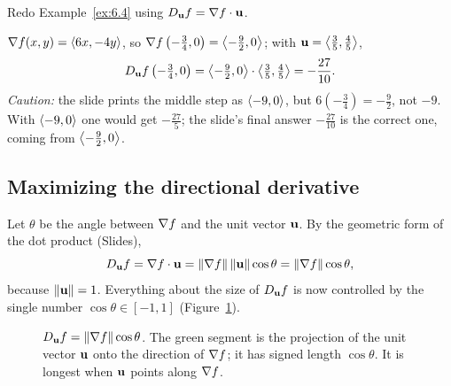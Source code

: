 \begin{example}
Redo Example~\ref{ex:6.4} using $D_{\mathbf{u}} f=\nabla f\cdot\mathbf{u}$.
\end{example}
\begin{solution}
$\nabla f(x,y)=\left\langle 6x,-4y \right\rangle$, so $\nabla f\left(-\tfrac34,0\right)=\left\langle -\tfrac92,0 \right\rangle$; with
$\mathbf{u}=\left\langle \tfrac35,\tfrac45 \right\rangle$,
\[
  D_{\mathbf{u}} f\left(-\tfrac34,0\right)=\left\langle -\tfrac92,0 \right\rangle\cdot\left\langle \tfrac35,\tfrac45 \right\rangle=-\frac{27}{10}.
\]
\emph{Caution:} the slide prints the middle step as $\left\langle -9,0 \right\rangle$, but
$6\left(-\frac34\right)=-\frac92$, not $-9$. With $\left\langle -9,0 \right\rangle$ one would get
$-\frac{27}{5}$; the slide's final answer $-\frac{27}{10}$ is the correct one,
coming from $\left\langle -\frac92,0 \right\rangle$.
\end{solution}

\subsection{Maximizing the directional derivative}

Let $\theta$ be the angle between $\nabla f$ and the unit vector $\mathbf{u}$. By the
geometric form of the dot product (Slides),
\[
  D_{\mathbf{u}} f=\nabla f\cdot\mathbf{u}=\lVert\nabla f\rVert\,\lVert\mathbf{u}\rVert\cos\theta=\lVert\nabla f\rVert\cos\theta,
\]
because $\lVert\mathbf{u}\rVert=1$. Everything about the size of $D_{\mathbf{u}} f$ is now controlled
by the single number $\cos\theta\in[-1,1]$ (Figure~\ref{fig:angle}).

\begin{figure}[H]
\centering
{}
\caption{$D_{\mathbf{u}} f=\lVert\nabla f\rVert\cos\theta$. The green segment is the projection
of the unit vector $\mathbf{u}$ onto the direction of $\nabla f$; it has signed length
$\cos\theta$. It is longest when $\mathbf{u}$ points along $\nabla f$.}
\label{fig:angle}
\end{figure}

